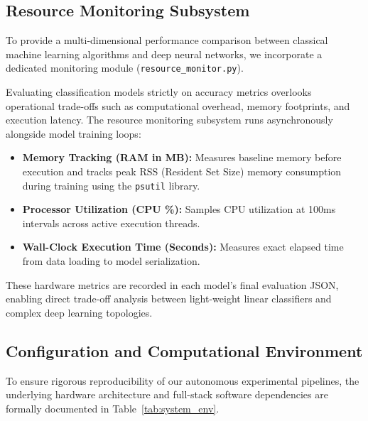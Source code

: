 \documentclass[conference]{IEEEtran}
\begin{document}
\subsection{Resource Monitoring Subsystem}
To provide a multi-dimensional performance comparison between classical machine learning algorithms and deep neural networks, we incorporate a dedicated monitoring module (\texttt{resource\_monitor.py}).

Evaluating classification models strictly on accuracy metrics overlooks operational trade-offs such as computational overhead, memory footprints, and execution latency. The resource monitoring subsystem runs asynchronously alongside model training loops:

\begin{itemize}
    \item \textbf{Memory Tracking (RAM in MB):} Measures baseline memory before execution and tracks peak RSS (Resident Set Size) memory consumption during training using the \texttt{psutil} library.
    \item \textbf{Processor Utilization (CPU \%):} Samples CPU utilization at 100ms intervals across active execution threads.
    \item \textbf{Wall-Clock Execution Time (Seconds):} Measures exact elapsed time from data loading to model serialization.
\end{itemize}

These hardware metrics are recorded in each model's final evaluation JSON, enabling direct trade-off analysis between light-weight linear classifiers and complex deep learning topologies.

\subsection{Configuration and Computational Environment}
To ensure rigorous reproducibility of our autonomous experimental pipelines, the underlying hardware architecture and full-stack software dependencies are formally documented in Table~\ref{tab:system_env}.
\end{document}
